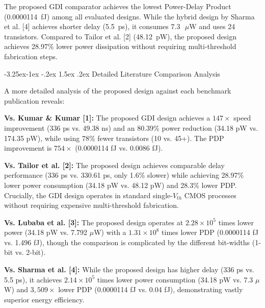\documentclass[12pt,a4paper,oneside]{report}
\makeatletter
\renewcommand\section{\@startsection {section}{1}{\z@}%
                                   {-3.5ex \@plus -1ex \@minus -.2ex}%
                                   {2.3ex \@plus.2ex}%
                                   {\normalfont\normalsize\bfseries}}
\renewcommand\subsection{\@startsection{subsection}{2}{\z@}%
                                     {-3.25ex\@plus -1ex \@minus -.2ex}%
                                     {1.5ex \@plus .2ex}%
                                     {\normalfont\normalsize\bfseries\itshape}}
\makeatother
\begin{document}
The proposed GDI comparator achieves the lowest Power-Delay Product (0.0000114~fJ) among all evaluated designs. While the hybrid design by Sharma et al. [4] achieves shorter delay (5.5~ps), it consumes $7.3\text{ }\mu\text{W}$ and uses 24 transistors. Compared to Tailor et al. [2] (48.12~pW), the proposed design achieves 28.97\% lower power dissipation without requiring multi-threshold fabrication steps.

\subsection{Detailed Literature Comparison Analysis}

A more detailed analysis of the proposed design against each benchmark publication reveals:

\noindent\textbf{Vs. Kumar \& Kumar [1]:} The proposed GDI design achieves a $147\times$ speed improvement (336 ps vs. 49.38 ns) and an 80.39\% power reduction (34.18 pW vs. 174.35 pW), while using 78\% fewer transistors (10 vs. 45+). The PDP improvement is $754\times$ (0.0000114 fJ vs. 0.0086 fJ).

\noindent\textbf{Vs. Tailor et al. [2]:} The proposed design achieves comparable delay performance (336 ps vs. 330.61 ps, only 1.6\% slower) while achieving 28.97\% lower power consumption (34.18 pW vs. 48.12 pW) and 28.3\% lower PDP. Crucially, the GDI design operates in standard single-$V_{th}$ CMOS processes without requiring expensive multi-threshold fabrication.

\noindent\textbf{Vs. Lubaba et al. [3]:} The proposed design operates at $2.28 \times 10^5$ times lower power (34.18 pW vs. 7.792 $\mu$W) with a $1.31 \times 10^8$ times lower PDP (0.0000114 fJ vs. 1.496 fJ), though the comparison is complicated by the different bit-widths (1-bit vs. 2-bit).

\noindent\textbf{Vs. Sharma et al. [4]:} While the proposed design has higher delay (336 ps vs. 5.5 ps), it achieves $2.14 \times 10^5$ times lower power consumption (34.18 pW vs. 7.3 $\mu$W) and $3,509\times$ lower PDP (0.0000114 fJ vs. 0.04 fJ), demonstrating vastly superior energy efficiency.


\end{document}
